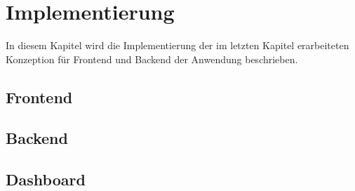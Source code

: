 \chapter{Implementierung}

In diesem Kapitel wird die Implementierung der im letzten Kapitel erarbeiteten
Konzeption für Frontend und Backend der Anwendung beschrieben.



\section{Frontend}










\section{Backend}









\section{Dashboard}